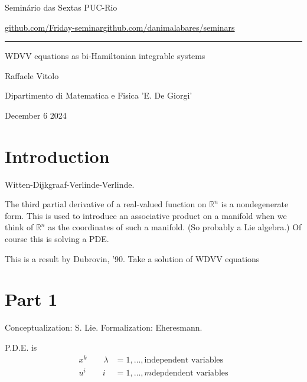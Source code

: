 


\begin{minipage}{\textwidth}
	\begin{minipage}{1\textwidth}
		Semin\'ario das Sextas \hfill PUC-Rio
		
		{\small\href{https://github.com/Friday-seminar/}{github.com/Friday-seminar}\hfill\href{https://github.com/danimalabares/seminars}{github.com/danimalabares/seminars}}
		\end{minipage}
\end{minipage}\vspace{.2cm}\hrule

\vspace{10pt}

{\Huge WDVV equations as bi-Hamiltonian integrable systems}


\hfill{\Large Raffaele Vitolo}

\hfill{\Large Dipartimento di Matematica e Fisica 'E. De Giorgi'}

\hfill{\large December 6 2024}

\section{Introduction}

Witten-Dijkgraaf-Verlinde-Verlinde.

The third partial derivative of a real-valued function on $\mathbb{R}^n$ is a nondegenerate form. This is used to introduce an associative product on a manifold when we think of $\mathbb{R}^n$ as the coordinates of such a manifold. (So probably a Lie algebra.) Of course this is solving a PDE.

This is a result by Dubrovin, '90. Take a solution of WDVV equations 


\section{Part 1}

Conceptualization: S. Lie. Formalization: Eheresmann.

P.D.E. is 
\begin{align*}
x^k \qquad \lambda&=1,\ldots,\text{independent variables} \\
u^i\qquad i&=1,\ldots,m \text{depdendent variables} 
\end{align*}

